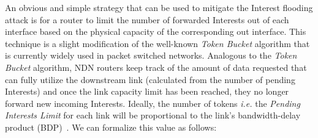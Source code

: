 




An obvious and simple strategy that can be used to mitigate the Interest flooding attack is for a router to limit the number of forwarded Interests out of each interface based on the physical capacity of the corresponding out interface. This technique is a slight modification of the well-known {\it Token Bucket} algorithm that is currently widely used in packet switched networks. Analogous to the {\it Token Bucket} algorithm, NDN routers keep track of the amount of data requested that can fully utilize the downstream link (calculated from the number of pending Interests) and once the link capacity limit has been reached, they no longer forward new incoming Interests. Ideally, the number of tokens {\it i.e.} the \emph{Pending Interests Limit} for each link will be proportional to the link's bandwidth-delay product (BDP)~\cite{tcp-survey}. We can formalize this value as follows:

